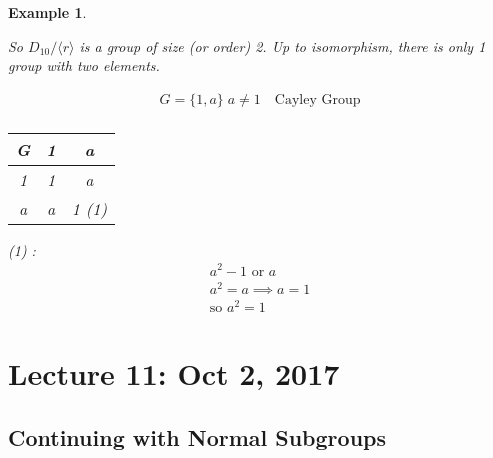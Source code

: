 \documentclass[11pt, oneside]{book}
\theoremstyle{break}
\newtheorem{eg}{Example}[section]
\begin{document}
\begin{eg}
\begin{enumerate}
            So $D_{10} / \langle r \rangle$ is a group of size (or order) 2. Up to isomorphism, there is only 1 group with two elements.

            \begin{gather*}
                G = \{1, a\} \; a \neq 1 \quad \text{Cayley Group} \\
            \end{gather*}
            \begin{tabular}{c | c | c}
             G & 1 & a \\
             \hline
             1 & 1 & a \\
             \hline
             a & a & 1 (1)
            \end{tabular}

            (1) :
            \begin{gather*}
                a^2 - 1 \text{ or } a \\
                a^2 = a \implies a = 1 \\
                \text{so } a^2 = 1
            \end{gather*}

    \end{enumerate}
\end{eg}

\chapter{Lecture 11: Oct 2, 2017}\label{chp:lec11}

\section{Continuing with Normal Subgroups}\label{sect:normal subgroups cont 3}
\end{document}

